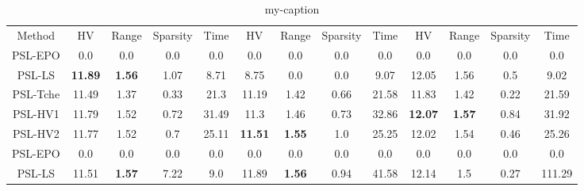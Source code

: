 \begin{table}[]
\centering
\caption{my-caption}
\label{my-label}
\begin{tabular}{ccccccccccccc}
Method  &        HV            &              Range        &             Sparsity&        Time  &      HV            &              Range        &             Sparsity&        Time &     HV            &              Range        &             Sparsity&        Time\\
PSL-EPO &        0.0           &              0.0          &             0.0     &        0.0   &      0.0           &              0.0          &             0.0     &        0.0  &     0.0           &              0.0          &             0.0     &        0.0\\
PSL-LS  &        \textbf{11.89}&              \textbf{1.56}&             1.07    &        8.71  &      8.75          &              0.0          &             0.0     &        9.07 &     12.05         &              1.56         &             0.5     &        9.02\\
PSL-Tche&        11.49         &              1.37         &             0.33    &        21.3  &      11.19         &              1.42         &             0.66    &        21.58&     11.83         &              1.42         &             0.22    &        21.59\\
PSL-HV1 &        11.79         &              1.52         &             0.72    &        31.49 &      11.3          &              1.46         &             0.73    &        32.86&     \textbf{12.07}&              \textbf{1.57}&             0.84    &        31.92\\
PSL-HV2 &        11.77         &              1.52         &             0.7     &        25.11 &      \textbf{11.51}&              \textbf{1.55}&             1.0     &        25.25&     12.02         &              1.54         &             0.46    &        25.26\\
PSL-EPO &        0.0           &              0.0          &             0.0     &        0.0   &      0.0           &              0.0          &             0.0     &        0.0  &     0.0           &              0.0          &             0.0     &        0.0\\
PSL-LS  &        11.51         &              \textbf{1.57}&             7.22    &        9.0   &      11.89         &              \textbf{1.56}&             0.94    &        41.58&     12.14         &              1.5          &             0.27    &        111.29\\

\end{tabular}
\end{table}
